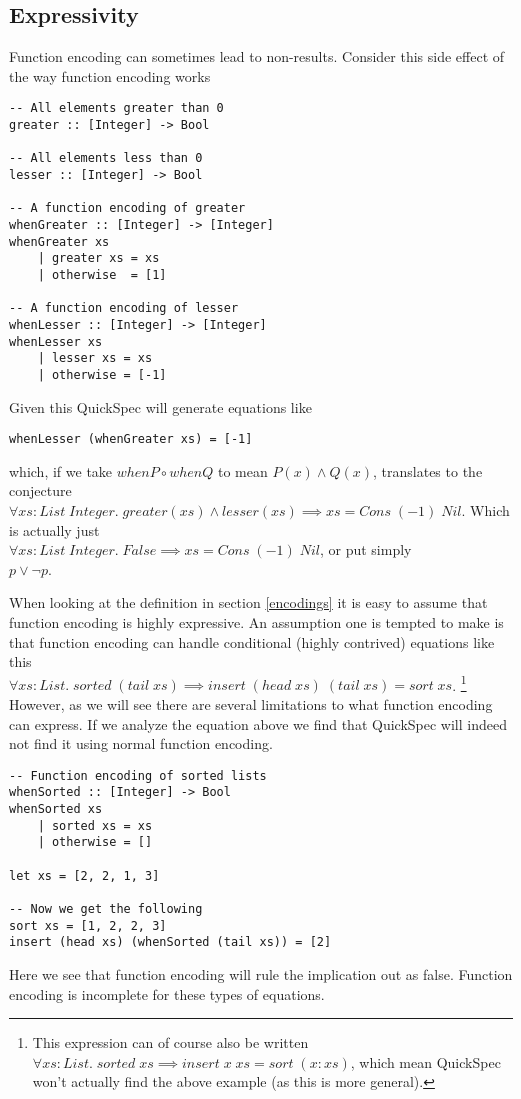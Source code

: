 \subsection{Expressivity}

Function encoding can sometimes lead to non-results.
Consider this side effect
of the way function encoding works
\begin{verbatim}-- All elements greater than 0
greater :: [Integer] -> Bool

-- All elements less than 0 
lesser :: [Integer] -> Bool

-- A function encoding of greater
whenGreater :: [Integer] -> [Integer]
whenGreater xs
    | greater xs = xs
    | otherwise  = [1]

-- A function encoding of lesser 
whenLesser :: [Integer] -> [Integer]
whenLesser xs
    | lesser xs = xs
    | otherwise = [-1]\end{verbatim}
Given this QuickSpec will generate equations like
\begin{verbatim}whenLesser (whenGreater xs) = [-1]\end{verbatim}
which, if we take $whenP\circ whenQ$ to mean $P(x)\wedge Q(x)$,  translates to the conjecture\\
$\forall xs : List\; Integer.\; greater(xs)\wedge lesser(xs)\implies xs = Cons\; (-1)\; Nil$.
Which is actually just\\$\forall xs : List\; Integer.\; False\implies xs = Cons\; (-1)\; Nil$,
or put simply\\$p\vee \neg p$.

When looking at the definition in 
section \ref{encodings} it is easy to assume
that function encoding is highly expressive.
An assumption one is tempted to make is that
function encoding can handle conditional (highly contrived)
equations like this\\
$\forall xs : List.\;sorted\;(tail\; xs) \implies insert\;(head\;xs)\;(tail\;xs)=sort\;xs$.
\footnote{This expression can of course also be written
$\forall xs : List.\;sorted\;xs \implies insert\;x\;xs=sort\;(x:xs)$,
which mean QuickSpec won't actually find the above example (as this is more general).}
However, as we will see there are several limitations to what function encoding can express.
If we analyze the equation above we find that QuickSpec will indeed not find it
using normal function encoding.
\begin{verbatim}-- Function encoding of sorted lists
whenSorted :: [Integer] -> Bool
whenSorted xs
    | sorted xs = xs
    | otherwise = []

let xs = [2, 2, 1, 3]

-- Now we get the following
sort xs = [1, 2, 2, 3]
insert (head xs) (whenSorted (tail xs)) = [2]\end{verbatim}
Here we see that function encoding will rule the implication out as false. Function encoding is
incomplete for these types of equations.

